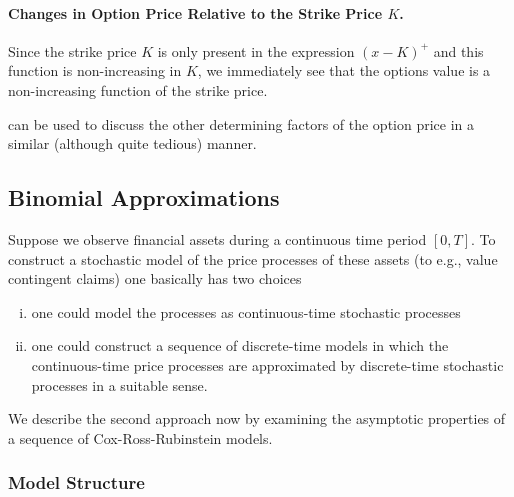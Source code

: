\paragraph{Changes in Option Price Relative to the Strike Price \(K\).}

Since the strike price \(K\) is only present in the expression \((x - K)^{+}\) and this function is non-increasing in \(K\), we immediately see that the options value is a non-increasing function of the strike price.

 can be used to discuss the other determining factors of the option price in a similar (although quite tedious) manner.

\subsection{Binomial Approximations}

Suppose we observe financial assets during a continuous time period \([0, T]\). To construct a stochastic model of the price processes of these assets (to e.g., value contingent claims) one basically has two choices

\begin{enumerate}[(i)]
	\item one could model the processes as continuous-time stochastic processes
	\item one could construct a sequence of discrete-time models in which the continuous-time price processes are approximated by discrete-time stochastic processes in a suitable sense.
\end{enumerate}

We describe the second approach now by examining the asymptotic properties of a sequence of Cox-Ross-Rubinstein models.

\subsubsection{Model Structure}

